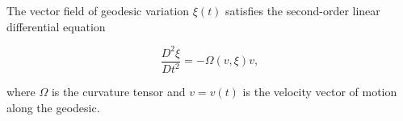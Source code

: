 The vector field of geodesic variation $\xi(t)$ satisfies the second-order linear differential equation

$$\frac{D^2 \xi}{Dt^2} = -\Omega(v, \xi)v,$$

where $\Omega$ is the curvature tensor and $v = v(t)$ is the velocity vector of motion along the geodesic.
